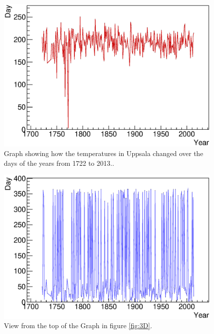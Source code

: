 \begin{figure}[h]
\begin{center}
\includegraphics[width=12cm]{graph1DHot.eps}
\caption{Graph showing how the temperatures in Uppsala changed over the days of the years from 1722 to 2013..}
\label{fig:HotGraph}
\end{center}
\end{figure}

\begin{figure}[h]
\begin{center}
\includegraphics[width=12cm]{graph1DCold.eps}
\caption{View from the top of the Graph in figure \ref{fig:3D}.}
\label{fig:ColdGraph}
\end{center}
\end{figure}

